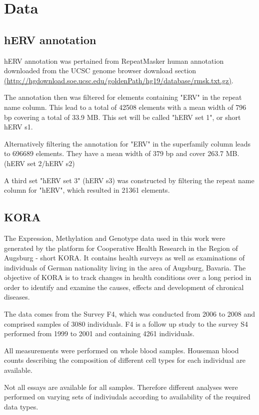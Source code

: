 \documentclass[a4paper,12pt]{article}
\begin{document}
\newpage
\section{Data}


\subsection{hERV annotation}
hERV annotation was pertained from RepeatMasker human annotation downloaded from the UCSC genome browser download section \url{(http://hgdownload.soe.ucsc.edu/goldenPath/hg19/database/rmsk.txt.gz)}.
 
The annotation then was filtered for elements containing "ERV" in the repeat name column. This lead to a total of 42508 elements with a mean width of 796 bp covering a total of 33.9 MB. This set will be called "hERV set 1", or short hERV s1.

Alternatively filtering the annotation for "ERV" in the superfamily column leads to 696689 elements. They have a mean width of 379 bp and cover 263.7 MB. (hERV set 2/hERV s2)

A third set "hERV set 3" (hERV s3) was constructed by filtering the repeat name column for "hERV", which resulted in 21361 elements. 

\subsection{KORA}
The Expression, Methylation and Genotype data used in this work were generated by the platform for Cooperative Health Research in the Region of Augsburg - short KORA. It contains health surveys as well as examinations of individuals of German nationality living in the area of Augsburg, Bavaria.
The objective of KORA is to track changes in health conditions over a long period in order to identify and examine the causes, effects and development of chronical diseases.

The data comes from the Survey F4, which was conducted from 2006 to 2008 and comprised samples of 3080 individuals. F4 is a follow up study to the survey S4 performed from 1999 to 2001 and containing 4261 individuals. 

All measurements were performed on whole blood samples. Houseman blood counts describing the composition of different cell types for each individual are available.

Not all essays are available for all samples. Therefore different analyses were performed on varying sets of indiviudals according to availability of the required data types.
\end{document}
